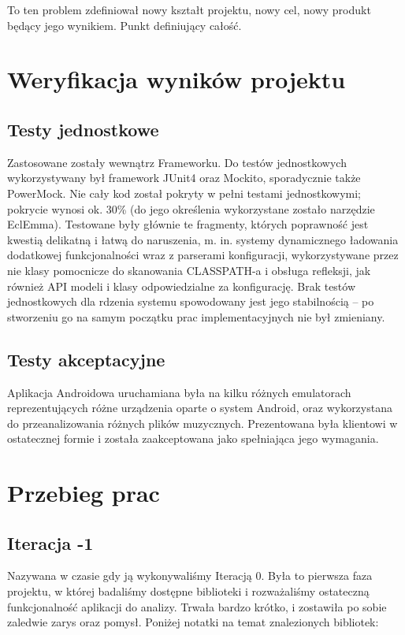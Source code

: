 To ten problem zdefiniował nowy kształt projektu, nowy cel, nowy produkt będący jego wynikiem. Punkt definiujący całość.

\chapter{Weryfikacja wyników projektu}

\section{Testy jednostkowe}
Zastosowane zostały wewnątrz Frameworku. Do testów jednostkowych wykorzystywany był framework JUnit4 oraz Mockito, sporadycznie także
PowerMock. Nie cały kod został pokryty w pełni testami jednostkowymi; pokrycie wynosi ok. 30\% (do
jego określenia wykorzystane zostało narzędzie EclEmma). Testowane były głównie te fragmenty,
których poprawność jest kwestią delikatną i łatwą do naruszenia, m. in. systemy dynamicznego
ładowania dodatkowej funkcjonalności wraz z parserami konfiguracji, wykorzystywane przez nie klasy
pomocnicze do skanowania CLASSPATH-a i obsługa refleksji, jak również API modeli i klasy
odpowiedzialne za konfigurację. Brak testów jednostkowych dla rdzenia systemu spowodowany jest jego
stabilnością -- po stworzeniu go na samym początku prac implementacyjnych nie był zmieniany.

\section{Testy akceptacyjne}
Aplikacja Androidowa uruchamiana była na kilku różnych emulatorach reprezentujących różne urządzenia oparte o system Android, oraz wykorzystana do przeanalizowania różnych plików muzycznych. Prezentowana była klientowi w ostatecznej formie i została zaakceptowana jako spełniająca jego wymagania.

\chapter{Przebieg prac}

\section{Iteracja -1}
Nazywana w czasie gdy ją wykonywaliśmy Iteracją 0. Była to pierwsza faza projektu, w której badaliśmy dostępne biblioteki i rozważaliśmy ostateczną funkcjonalność aplikacji do analizy. Trwała bardzo krótko, i zostawiła po sobie zaledwie zarys oraz pomysł. Poniżej notatki na temat znalezionych bibliotek:


